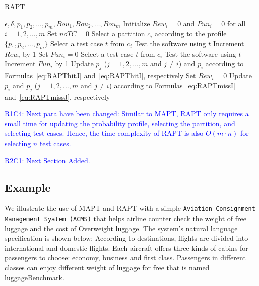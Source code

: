 \documentclass[10pt,journal,compsoc]{IEEEtran}
\begin{document}
\begin{algorithm}
	\caption{RAPT}
	\label{alg:RAPT}
	\begin{algorithmic}[1]
		\renewcommand{\algorithmicrequire}{\textbf{Input:}}
		\renewcommand{\algorithmicensure}{\textbf{Output:}}
		\renewcommand{\algorithmicendwhile}{\algorithmicend\_\algorithmicwhile}
		\renewcommand{\algorithmicendfor}{\algorithmicend\_\algorithmicfor}
		\renewcommand{\algorithmicendif}{\algorithmicend\_\algorithmicif}
		\renewcommand{\algorithmicthen}{}
		\renewcommand{\algorithmicdo}{}
		\REQUIRE $\epsilon, \delta, p_1, p_2, \ldots, p_m, Bou_1, Bou_2, \ldots, Bou_m$
		\STATE Initialize $Rew_i = 0$ and $Pun_i = 0$ for all $i = 1, 2, \ldots, m$
		\STATE Set $noTC = 0$
		\STATE Select a partition $c_i$ according to the profile $\{p_1, p_2, \ldots, p_m\}$
		\STATE Select a test case $t$ from $c_i$
		\STATE Test the software using $t$
		\STATE Increment $Rew_i$ by 1
		\STATE Set $Pun_i = 0$
		\STATE Select a test case $t$ from $c_i$
		\STATE Test the software using $t$
		\ENDWHILE
		\STATE Increment $Pun_i$ by 1
		\STATE Update $p_j$ ($j = 1, 2, \ldots, m$ and $j \neq i$) and $p_i$ according to Formulas~\ref{eq:RAPThitJ} and~\ref{eq:RAPThitI}, respectively
		\STATE Set $Rew_i = 0$
		\ELSE
		\STATE Update $p_i$ and $p_j$ ($j = 1, 2, \ldots, m$ and $j \neq i$) according to Formulas~\ref{eq:RAPTmissI} and~\ref{eq:RAPTmissJ}, respectively
		\ENDIF
		\ENDWHILE
	\end{algorithmic}
\end{algorithm}


\textcolor{blue}{R1C4: Next para have been changed:
Similar to MAPT, RAPT only requires a small time for updating the probability profile, selecting the partition, and selecting test cases. Hence, the time complexity of RAPT is also $O(m \cdot n)$ for selecting $n$ test cases.}

\textcolor{blue}{R2C1: Next Section Added.}
\subsection{Example}
\label{example}
We illustrate the use of MAPT and RAPT with a simple \texttt{Aviation Consignment Management Syatem (ACMS)} that helps airline counter check the weight of free luggage and the cost of Overweight luggage. The system's natural language specification is shown below: According to destinations, flights are divided into international and domestic flights. Each aircraft offers three kinds of cabins for passengers to choose: economy, business and first class. Passengers in different classes can enjoy different weight of luggage for free that is named luggageBenchmark.
\end{document}
